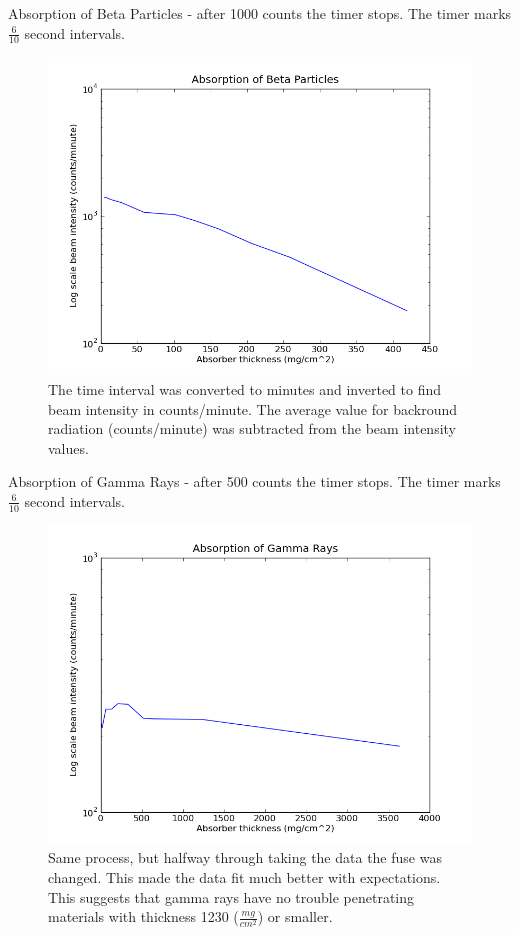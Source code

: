\documentclass[12pt]{article}
\begin{document}
\indent \indent Absorption of Beta Particles - after 1000 counts the timer stops. The timer marks $\frac{6}{10}$ second intervals.

\begin{figure}[H]
\centering
\hspace{-0.0in}\includegraphics[scale=0.60]{Plot3.png}
\caption{The time interval was converted to minutes and inverted to find beam intensity in counts/minute. The average value for backround radiation (counts/minute) was subtracted from the beam intensity values. \label{fig:setup}}
\end{figure}

\indent \indent Absorption of Gamma Rays - after 500 counts the timer stops. The timer marks $\frac{6}{10}$ second intervals.

\begin{figure}[H]
\centering
\hspace{-0.0in}\includegraphics[scale=0.60]{Plot4.png}
\caption{Same process, but halfway through taking the data the fuse was changed. This made the data fit much better with expectations. This suggests that gamma rays have no trouble penetrating materials with thickness 1230 ($\frac{mg}{cm^2}$) or smaller. \label{fig:setup}}
\end{figure}
\end{document}
